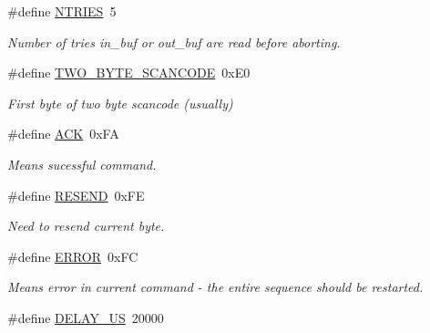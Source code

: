 \begin{DoxyCompactItemize}
\hypertarget{group__i8042_gad5a4898d322ab25d2e9e0da38b07ee37}{}\label{group__i8042_gad5a4898d322ab25d2e9e0da38b07ee37} 
\#define \hyperlink{group__i8042_gad5a4898d322ab25d2e9e0da38b07ee37}{N\+T\+R\+I\+ES}~5
\begin{DoxyCompactList}\small\item\em Number of tries in\+\_\+buf or out\+\_\+buf are read before aborting. \end{DoxyCompactList}\item 
\hypertarget{group__i8042_ga9a86f4f038ce85ff0308b0674a6849f2}{}\label{group__i8042_ga9a86f4f038ce85ff0308b0674a6849f2} 
\#define \hyperlink{group__i8042_ga9a86f4f038ce85ff0308b0674a6849f2}{T\+W\+O\+\_\+\+B\+Y\+T\+E\+\_\+\+S\+C\+A\+N\+C\+O\+DE}~0x\+E0
\begin{DoxyCompactList}\small\item\em First byte of two byte scancode (usually) \end{DoxyCompactList}\item 
\hypertarget{group__i8042_ga6f6489887e08bff4887d0bc5dcf214d8}{}\label{group__i8042_ga6f6489887e08bff4887d0bc5dcf214d8} 
\#define \hyperlink{group__i8042_ga6f6489887e08bff4887d0bc5dcf214d8}{A\+CK}~0x\+FA
\begin{DoxyCompactList}\small\item\em Means sucessful command. \end{DoxyCompactList}\item 
\hypertarget{group__i8042_ga92f67631ef5a97e4a266c15bc710776d}{}\label{group__i8042_ga92f67631ef5a97e4a266c15bc710776d} 
\#define \hyperlink{group__i8042_ga92f67631ef5a97e4a266c15bc710776d}{R\+E\+S\+E\+ND}~0x\+FE
\begin{DoxyCompactList}\small\item\em Need to resend current byte. \end{DoxyCompactList}\item 
\hypertarget{group__i8042_ga8fe83ac76edc595f6b98cd4a4127aed5}{}\label{group__i8042_ga8fe83ac76edc595f6b98cd4a4127aed5} 
\#define \hyperlink{group__i8042_ga8fe83ac76edc595f6b98cd4a4127aed5}{E\+R\+R\+OR}~0x\+FC
\begin{DoxyCompactList}\small\item\em Means error in current command -\/ the entire sequence should be restarted. \end{DoxyCompactList}\item 
\hypertarget{group__i8042_ga1a522aa19bcb695a9df30032a893bee3}{}\label{group__i8042_ga1a522aa19bcb695a9df30032a893bee3} 
\#define \hyperlink{group__i8042_ga1a522aa19bcb695a9df30032a893bee3}{D\+E\+L\+A\+Y\+\_\+\+US}~20000

\end{DoxyCompactItemize}
